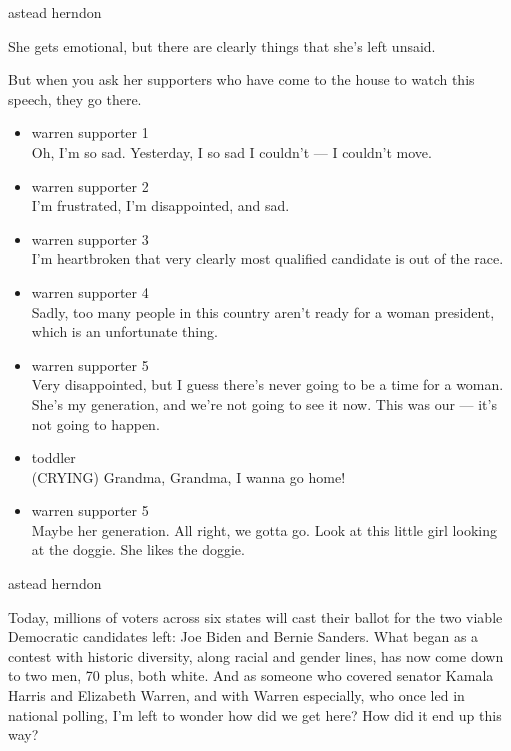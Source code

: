 astead herndon

She gets emotional, but there are clearly things that she's left unsaid.

But when you ask her supporters who have come to the house to watch this
speech, they go there.

\begin{itemize}
\item
  warren supporter 1\\
  Oh, I'm so sad. Yesterday, I so sad I couldn't --- I couldn't move.
\item
  warren supporter 2\\
  I'm frustrated, I'm disappointed, and sad.
\item
  warren supporter 3\\
  I'm heartbroken that very clearly most qualified candidate is out of
  the race.
\item
  warren supporter 4\\
  Sadly, too many people in this country aren't ready for a woman
  president, which is an unfortunate thing.
\item
  warren supporter 5\\
  Very disappointed, but I guess there's never going to be a time for a
  woman. She's my generation, and we're not going to see it now. This
  was our --- it's not going to happen.
\item
  toddler\\
  (CRYING) Grandma, Grandma, I wanna go home!
\item
  warren supporter 5\\
  Maybe her generation. All right, we gotta go. Look at this little girl
  looking at the doggie. She likes the doggie.
\end{itemize}

astead herndon

Today, millions of voters across six states will cast their ballot for
the two viable Democratic candidates left: Joe Biden and Bernie Sanders.
What began as a contest with historic diversity, along racial and gender
lines, has now come down to two men, 70 plus, both white. And as someone
who covered senator Kamala Harris and Elizabeth Warren, and with Warren
especially, who once led in national polling, I'm left to wonder how did
we get here? How did it end up this way?

